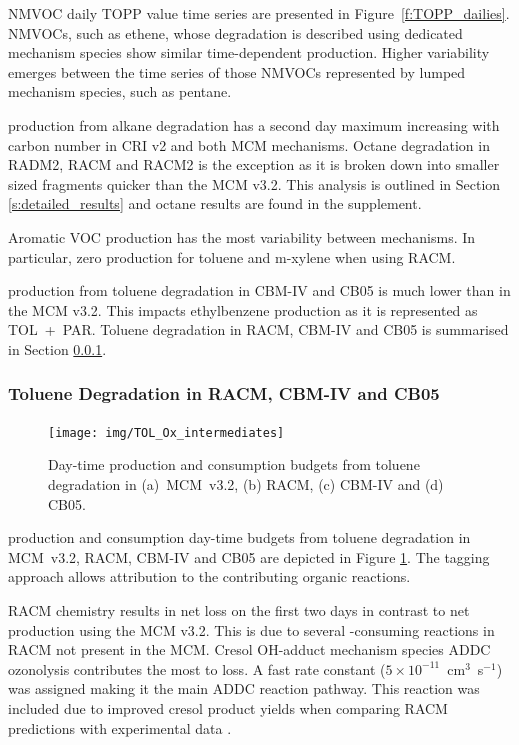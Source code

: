 NMVOC daily TOPP value time series are presented in \mbox{Figure \ref{f:TOPP_dailies}}. 
NMVOCs, such as ethene, whose degradation is described using dedicated mechanism species show similar time-dependent  production.
Higher variability emerges between the time series of those NMVOCs represented by lumped mechanism species, such as pentane.

 production from alkane degradation has a second day maximum increasing with carbon number in CRI v2 and both MCM mechanisms.
Octane degradation in RADM2, RACM and RACM2 is the exception as it is broken down into smaller sized fragments quicker than the MCM v3.2.
This analysis is outlined in Section \ref{s:detailed_results} and octane results are found in the supplement.

Aromatic VOC  production has the most variability between mechanisms. 
In particular, zero  production for toluene and m-xylene when using RACM.

 production from toluene degradation in CBM-IV and CB05 is much lower than in the MCM v3.2.
This impacts ethylbenzene  production as it is represented as \mbox{TOL + PAR}. 
Toluene degradation in RACM, CBM-IV and CB05 is summarised in Section \ref{sss:aromatic}.  

\subsubsection{Toluene Degradation in RACM, CBM-IV and CB05} \label{sss:aromatic}

\begin{figure}
    \centering
    \texttt{[image: img/TOL\_Ox\_intermediates]}
    \vspace{0mm}
    \caption{Day-time  production and consumption budgets from toluene degradation in \mbox{(a) MCM v3.2}, (b) RACM, (c) CBM-IV and (d) CB05.}
    \vspace{-4mm}
    \label{f:toluene_Ox}
\end{figure}

 production and consumption day-time budgets from toluene degradation in \mbox{MCM v3.2}, RACM, CBM-IV and CB05 are depicted in Figure \ref{f:toluene_Ox}. 
The tagging approach allows attribution to the contributing organic reactions.

RACM chemistry results in net  loss on the first two days in contrast to net  production using the MCM v3.2.
This is due to several -consuming reactions in RACM not present in the MCM.
Cresol OH-adduct mechanism species ADDC ozonolysis contributes the most to  loss.
A fast rate constant \mbox{($5 \times 10^{-11}$ cm$^3$ s$^{-1}$)} was assigned making it the main ADDC reaction pathway. 
This reaction was included due to improved cresol product yields when comparing RACM predictions with experimental data \citep{Stockwell:1997}.


